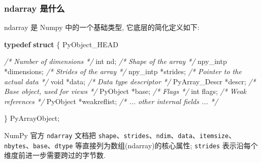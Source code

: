 \documentclass[11pt]{article}
\newenvironment{Shaded}{}{}
\newcommand{\KeywordTok}[1]{\textcolor[rgb]{0.00,0.44,0.13}{\textbf{{#1}}}}
\newcommand{\DataTypeTok}[1]{\textcolor[rgb]{0.56,0.13,0.00}{{#1}}}
\newcommand{\CommentTok}[1]{\textcolor[rgb]{0.38,0.63,0.69}{\textit{{#1}}}}
\newcommand{\NormalTok}[1]{{#1}}
\newcommand{\OperatorTok}[1]{\textcolor[rgb]{0.40,0.40,0.40}{{#1}}}
\begin{document}
    \subsubsection{ndarray 是什么}\label{ndarray-ux662fux4ec0ux4e48}

    ndarray 是 Numpy 中的一个基础类型, 它底层的简化定义如下:

\begin{Shaded}
\begin{Highlighting}[]
\KeywordTok{typedef} \KeywordTok{struct} \OperatorTok{\{}
\NormalTok{    PyObject\_HEAD}

    \CommentTok{/* Number of dimensions */}
    \DataTypeTok{int}\NormalTok{ nd}\OperatorTok{;}
    \CommentTok{/* Shape of the array */}
\NormalTok{    npy\_intp }\OperatorTok{*}\NormalTok{dimensions}\OperatorTok{;}
    \CommentTok{/* Strides of the array */}
\NormalTok{    npy\_intp }\OperatorTok{*}\NormalTok{strides}\OperatorTok{;}
    \CommentTok{/* Pointer to the actual data */}
    \DataTypeTok{void} \OperatorTok{*}\NormalTok{data}\OperatorTok{;}
    \CommentTok{/* Data type descriptor */}
\NormalTok{    PyArray\_Descr }\OperatorTok{*}\NormalTok{descr}\OperatorTok{;}
    \CommentTok{/* Base object, used for views */}
\NormalTok{    PyObject }\OperatorTok{*}\NormalTok{base}\OperatorTok{;}
    \CommentTok{/* Flags */}
    \DataTypeTok{int}\NormalTok{ flags}\OperatorTok{;}
    \CommentTok{/* Weak references */}
\NormalTok{    PyObject }\OperatorTok{*}\NormalTok{weakreflist}\OperatorTok{;}
    \CommentTok{/* ... other internal fields ... */}

\OperatorTok{\}}\NormalTok{ PyArrayObject}\OperatorTok{;}
\end{Highlighting}
\end{Shaded}

NumPy 官方 \texttt{ndarray} 文档把
\texttt{shape}、\texttt{strides}、\texttt{ndim}、\texttt{data}、\texttt{itemsize}、\texttt{nbytes}、\texttt{base}、\texttt{dtype}
等直接列为数组(ndarray)的核心属性; \texttt{strides}
表示沿每个维度前进一步需要跨过的字节数.
\end{document}
